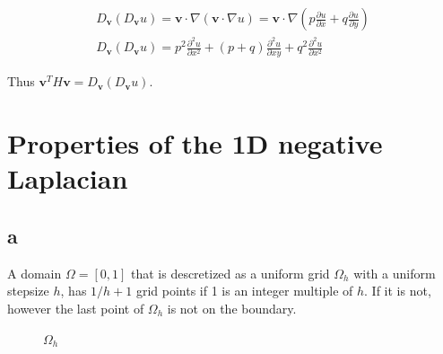 \documentclass{article}
\begin{document}
\begin{align*}
D_{\mathbf{v}}\left(D_{\mathbf{v}} u\right)=\mathbf{v}\cdot \nabla(\mathbf{v} \cdot \nabla u)=\mathbf{v}\cdot \nabla(p\frac{\partial u}{\partial x}+q\frac{\partial u}{\partial y})\\
D_{\mathbf{v}}\left(D_{\mathbf{v}} u\right)=p^2\frac{\partial^2 u}{\partial x^2}+(p+q)\frac{\partial^2 u}{\partial xy} +q^2\frac{\partial^2 u}{\partial x^2}
\end{align*}

Thus $\mathbf{v}^{T} H \mathbf{v}=D_{\mathbf{v}}\left(D_{\mathbf{v}} u\right)$.



\newpage
\section{Properties of the 1D negative Laplacian}
\subsection{a}
A domain $\Omega=\left[0,1\right]$ that is descretized as a uniform grid $\Omega_h$ with a uniform stepsize $h$, has $1/h+1$ grid points if 1 is an integer multiple of $h$. If it is not, however the last point of $\Omega_h$ is not on the boundary.
\begin{figure}[H]
\centering
{}
\caption{$\Omega_h$}
\end{figure}
\end{document}
